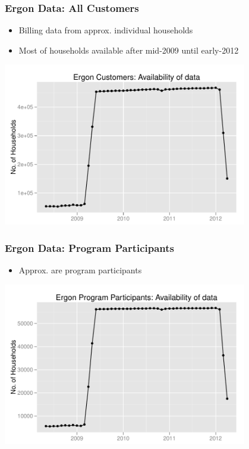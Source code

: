 \documentclass{beamer}
\begin{document}
\begin{frame}
\frametitle{Ergon Data: All Customers}
\begin{itemize}
\item Billing data from approx.  individual households
\item Most of households available after mid-2009 until early-2012
\end{itemize}
\begin{center}
\includegraphics[width=0.8\textwidth]{figures/ErgonAvailDataFilled}
\end{center}
\end{frame}

\begin{frame}
\frametitle{Ergon Data: Program Participants}
\begin{itemize}
\item Approx.  are program participants
\end{itemize}
\begin{center}
\includegraphics[width=0.8\textwidth]{figures/ErgonPartAvailData}
\end{center}
\end{frame}
\end{document}
